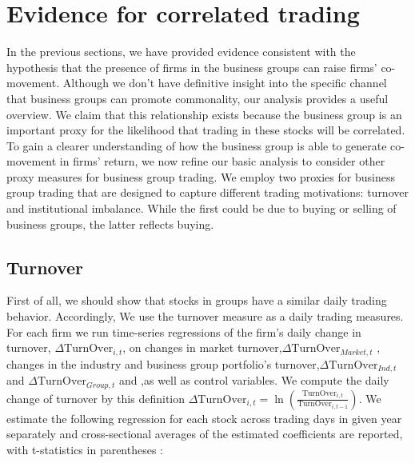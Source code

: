 \section{{Evidence for correlated trading} }


	In the previous sections, we have provided evidence consistent with the hypothesis that the presence of firms in the business groups can raise firms' co-movement. Although we don't have definitive insight into the specific channel that business groups can promote commonality, our analysis provides a useful overview.
	We claim that this relationship exists because the business group is an important proxy for the likelihood that trading in these stocks will be correlated. To gain a clearer understanding of how the business group is able to generate co-movement in firms' return, we now refine our basic analysis to consider other proxy measures for business group trading.
	We employ two proxies for business group trading that are designed to capture different trading motivations: turnover and institutional imbalance. While the first could be due to buying or selling of business groups, the latter reflects buying.
	
	





\subsection{{Turnover}}


	First of all, we should show that stocks in groups have a similar daily trading behavior. Accordingly, We use the turnover measure as a daily trading measures. For each firm we run time-series regressions of the firm's daily change in turnover, $ \Delta \text{TurnOver}_{i,t} $, on changes in market turnover,$ \Delta\text{TurnOver}_{Market,t}   $ , changes in the industry and business group portfolio's turnover,$ \Delta\text{TurnOver}_{Ind,t} $ and  $\Delta \text{TurnOver}_{Group,t} $ and  ,as well as control variables.
We compute the daily change of turnover by this definition $ \Delta \text{TurnOver}_{i,t} = \ln(\frac{\text{TurnOver}_{i,t}}{\text{TurnOver}_{i,t-1}}) $. 
We estimate the following regression for each stock across trading days in given year separately and cross-sectional averages of the estimated coefficients are reported, with t-statistics in parentheses :


